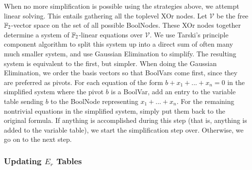 When no more simplification is possible using the strategies above, we attempt linear solving.
This entails gathering all the toplevel XOr nodes.  Let $\mathcal{V}$ be the free $\mathbb{F}_2$-vector space on the set of all possible BoolNodes.
These XOr nodes together determine a system of $\mathbb{F}_2$-linear equations over $\mathcal{V}$.
We use Tarski's principle component algorithm to split this system up into a direct sum of often many much smaller system, and use Gaussian Elimination to simplify.  
The resulting system is equivalent to the first, but simpler.
When doing the Gaussian Elimination, we order the basis vectors so that BoolVars come first, since they are preferred as pivots.  
For each equation of the form $b+x_1+...+x_n=0$ in the simplified system where the pivot $b$ is a BoolVar, add an entry to the variable table sending $b$ to the BoolNode representing $x_1+...+x_n$.
For the remaining nontrivial equations in the simplified system, simply put them back to the original formula.  
If anything is accomplished during this step (that is, anything is added to the variable table), we start the simplification step over.
Otherwise, we go on to the next step.  

\subsubsection{Updating $E_r$ Tables}

